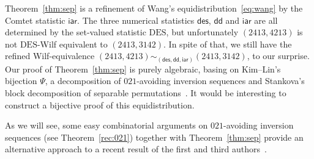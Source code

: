\documentclass[12pt]{amsart}
\numberwithin{equation}{section}
\theoremstyle{plain}
\theoremstyle{definition}
\def\des{\mathsf{des}}
\def\iar{\mathsf{iar}}
\def\DES{\mathrm{DES}}
\def\dd{\mathsf{dd}}
\begin{document}
Theorem~\ref{thm:sep} is a refinement of 
Wang's equidistribution~\eqref{eq:wang} by the Comtet statistic $\iar$. 
The three numerical statistics $\des$, $\dd$ and $\iar$ are all determined by the set-valued statistic $\DES$, but unfortunately $(2413,4213)$ is not $\DES$-Wilf equivalent to $(2413,3142)$. In spite of that, we still have the refined Wilf-equivalence $(2413,4213)\sim_{(\des,\dd,\iar)}(2413,3142)$, to our surprise. 
Our proof of Theorem~\ref{thm:sep} is purely algebraic, basing on Kim--Lin's bijection $\Psi$, a decomposition of $021$-avoiding inversion sequences and Stankova's block decomposition of separable permutations~\cite{sk}. It would be interesting to construct a bijective proof of this equidistribution. 

As we will see, some easy combinatorial arguments on $021$-avoiding inversion sequences (see Theorem~\ref{rec:021}) together with Theorem~\ref{thm:sep} provide an alternative approach to a recent result of the first and third authors~\cite[Theorem~3.2]{FW}.
\end{document}
